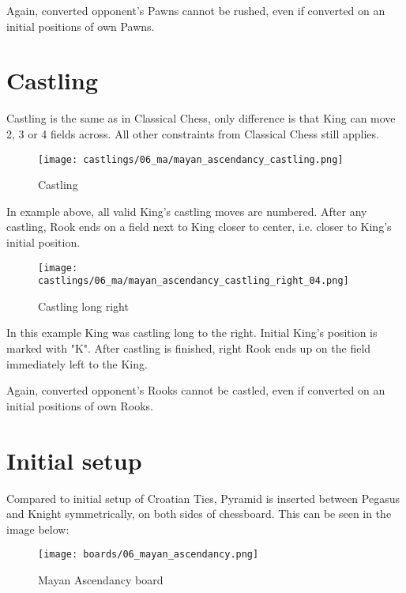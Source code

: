 Again, converted opponent's Pawns cannot be rushed, even if converted on an
initial positions of own Pawns.

\clearpage %

\section*{Castling}

Castling is the same as in Classical Chess, only difference is that King can move 2, 3 or 4 fields across.
All other constraints from Classical Chess still applies.

\noindent
\begin{figure}[!h]
\texttt{[image: castlings/06\_ma/mayan\_ascendancy\_castling.png]}
\caption{Castling}
\label{fig:mayan_ascendancy_castling}
\end{figure}

In example above, all valid King's castling moves are numbered. After any castling, Rook
ends on a field next to King closer to center, i.e. closer to King's initial position.

\noindent
\begin{figure}[!h]
\texttt{[image: castlings/06\_ma/mayan\_ascendancy\_castling\_right\_04.png]}
\caption{Castling long right}
\label{fig:mayan_ascendancy_castling_right_04}
\end{figure}

In this example King was castling long to the right. Initial King's position is marked with "K".
After castling is finished, right Rook ends up on the field immediately left to the King.

Again, converted opponent's Rooks cannot be castled, even if converted on an initial
positions of own Rooks.

\clearpage %

\section*{Initial setup}

Compared to initial setup of Croatian Ties, Pyramid is inserted between Pegasus and Knight
symmetrically, on both sides of chessboard. This can be seen in the image below:

\noindent
\begin{figure}[h]
\texttt{[image: boards/06\_mayan\_ascendancy.png]}
\caption{Mayan Ascendancy board}
\label{fig:06_mayan_ascendancy}
\end{figure}

\clearpage %
